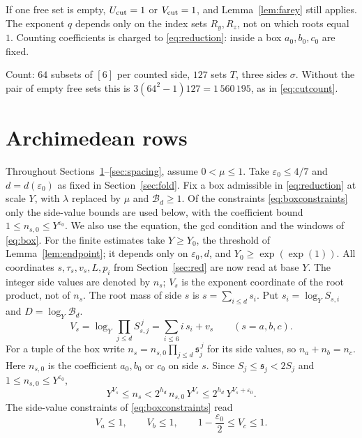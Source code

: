 \documentclass{amsart}
\theoremstyle{definition}
\theoremstyle{plain}
\numberwithin{equation}{section}
\numberwithin{table}{section}
\begin{document}
If one free set is empty, $U_{\rm cut}=1$ or $V_{\rm cut}=1$, and Lemma~\ref{lem:farey} still
applies. The exponent $q$ depends only on the index sets $R_y,R_z$, not on
which roots equal $1$. Counting coefficients is charged to \eqref{eq:reduction}:
inside a box $a_0,b_0,c_0$ are fixed.

Count: $64$ subsets of $[6]$ per counted side, $127$ sets $T$, three sides
$\sigma$. Without the pair of empty free sets this is
$3(64^2-1)127=1\,560\,195$, as in \eqref{eq:cutcount}.


\section{Archimedean rows}\label{sec:arch}

Throughout Sections~\ref{sec:arch}--\ref{sec:spacing}, assume
$0<\mu\le1$. Take $\varepsilon_0\le4/7$ and $d=d(\varepsilon_0)$ as fixed
in Section~\ref{sec:fold}. Fix a box admissible in \eqref{eq:reduction} at
scale $Y$, with $\lambda$ replaced by $\mu$ and $\mathcal B_d\ge1$. Of the constraints \eqref{eq:boxconstraints} only the side-value bounds are
used below, with the coefficient bound $1\le n_{s,0}\le Y^{\varepsilon_0}$. We
also use the equation, the gcd condition and the windows of \eqref{eq:box}. For the
finite estimates take $Y\ge Y_0$, the threshold of Lemma~\ref{lem:endpoint};
it depends only on $\varepsilon_0,d$, and $Y_0\ge\exp(\exp(1))$. All coordinates
$s,\tau_s,v_s,L,p_i$ from Section~\ref{sec:red} are now read at base $Y$.
The integer side values are denoted by $n_s$; $V_s$ is the exponent
coordinate of the root product, not of $n_s$. The root mass of side $s$ is
$s=\sum_{i\le d}s_i$.
Put $s_i=\log_YS_{s,i}$ and
$D=\log_Y\mathcal B_d$.
\begin{equation}\label{eq:V}
 V_s=\log_Y\prod_{j\le d}S_{s,j}^{\,j}=\sum_{i\le6}i\,s_i+v_s\qquad(s=a,b,c).
\end{equation}
For a tuple of the box write
$n_s=n_{s,0}\prod_{j\le d}\mathfrak s_j^{\,j}$ for its side values, so
$n_a+n_b=n_c$. Here $n_{s,0}$ is the coefficient $a_0,b_0$ or $c_0$ on
side $s$. Since $S_j\le\mathfrak s_j<2S_j$ and $1\le n_{s,0}\le Y^{\varepsilon_0}$,
\begin{equation}\label{eq:nsize}
 Y^{V_s}\le n_s<2^{h_d}\,n_{s,0}\,Y^{V_s}\le2^{h_d}\,Y^{V_s+\varepsilon_0}.
\end{equation}
The side-value constraints of \eqref{eq:boxconstraints} read
\begin{equation}\label{eq:Vbox}
 V_a\le1,\qquad V_b\le1,\qquad 1-\frac{\varepsilon_0}2\le V_c\le1 .
\end{equation}
\end{document}
